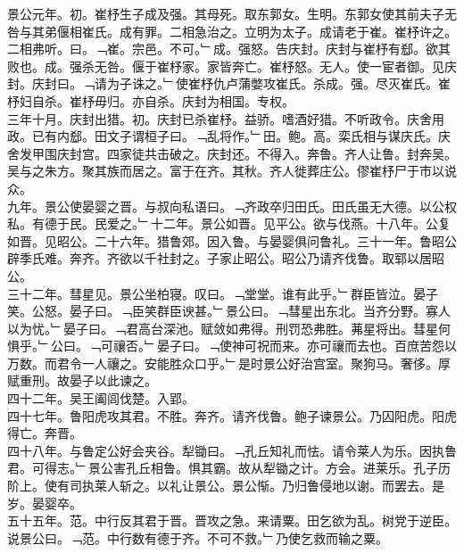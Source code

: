 \documentclass{zhvt-classic}
\begin{document}
\hspace*{2em}景公元年。初。崔杼生子成及强。其母死。取东郭女。生明。东郭女使其前夫子无咎与其弟偃相崔氏。成有罪。二相急治之。立明为太子。成请老于崔。崔杼许之。二相弗听。曰。﹁崔。宗邑。不可。﹂成。强怒。告庆封。庆封与崔杼有郄。欲其败也。成。强杀无咎。偃于崔杼家。家皆奔亡。崔杼怒。无人。使一宦者御。见庆封。庆封曰。﹁请为子诛之。﹂使崔杼仇卢蒲嫳攻崔氏。杀成。强。尽灭崔氏。崔杼妇自杀。崔杼毋归。亦自杀。庆封为相国。专权。\\
\hspace*{2em}三年十月。庆封出猎。初。庆封已杀崔杼。益骄。嗜酒好猎。不听政令。庆舍用政。已有内郄。田文子谓桓子曰。﹁乱将作。﹂田。鲍。高。栾氏相与谋庆氏。庆舍发甲围庆封宫。四家徒共击破之。庆封还。不得入。奔鲁。齐人让鲁。封奔吴。吴与之朱方。聚其族而居之。富于在齐。其秋。齐人徙葬庄公。僇崔杼尸于市以说众。\\
\hspace*{2em}九年。景公使晏婴之晋。与叔向私语曰。﹁齐政卒归田氏。田氏虽无大德。以公权私。有德于民。民爱之。﹂十二年。景公如晋。见平公。欲与伐燕。十八年。公复如晋。见昭公。二十六年。猎鲁郊。因入鲁。与晏婴俱问鲁礼。三十一年。鲁昭公辟季氏难。奔齐。齐欲以千社封之。子家止昭公。昭公乃请齐伐鲁。取郓以居昭公。\\
\hspace*{2em}三十二年。彗星见。景公坐柏寝。叹曰。﹁堂堂。谁有此乎。﹂群臣皆泣。晏子笑。公怒。晏子曰。﹁臣笑群臣谀甚。﹂景公曰。﹁彗星出东北。当齐分野。寡人以为忧。﹂晏子曰。﹁君高台深池。赋敛如弗得。刑罚恐弗胜。茀星将出。彗星何惧乎。﹂公曰。﹁可禳否。﹂晏子曰。﹁使神可祝而来。亦可禳而去也。百庶苦怨以万数。而君令一人禳之。安能胜众口乎。﹂是时景公好治宫室。聚狗马。奢侈。厚赋重刑。故晏子以此谏之。\\
\hspace*{2em}四十二年。吴王阖闾伐楚。入郢。\\
\hspace*{2em}四十七年。鲁阳虎攻其君。不胜。奔齐。请齐伐鲁。鲍子谏景公。乃囚阳虎。阳虎得亡。奔晋。\\
\hspace*{2em}四十八年。与鲁定公好会夹谷。犁锄曰。﹁孔丘知礼而怯。请令莱人为乐。因执鲁君。可得志。﹂景公害孔丘相鲁。惧其霸。故从犁锄之计。方会。进莱乐。孔子历阶上。使有司执莱人斩之。以礼让景公。景公惭。乃归鲁侵地以谢。而罢去。是岁。晏婴卒。\\
\hspace*{2em}五十五年。范。中行反其君于晋。晋攻之急。来请粟。田乞欲为乱。树党于逆臣。说景公曰。﹁范。中行数有德于齐。不可不救。﹂乃使乞救而输之粟。\\
\end{document}
